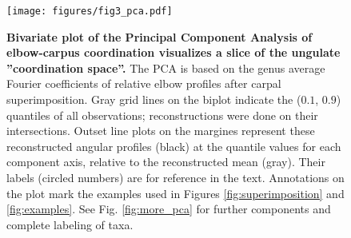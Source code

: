 \documentclass[10pt, a4paper]{article}
\begin{document}
\begin{figure}[t!]
\texttt{[image: figures/fig3\_pca.pdf]}
\caption[PCA]{\textbf{Bivariate plot of the Principal Component Analysis of elbow-carpus coordination visualizes a slice of the ungulate ''coordination space''.} 
The PCA is based on the genus average Fourier coefficients of relative elbow profiles after carpal superimposition. 
Gray grid lines on the biplot indicate the ($0.1$, $0.9$) quantiles of all observations; reconstructions were done on their intersections. 
Outset line plots on the margines represent these reconstructed angular profiles (black) at the quantile values for each component axis, relative to the reconstructed mean (gray). 
Their labels (circled numbers) are for reference in the text.
Annotations on the plot mark the examples used in Figures \ref{fig:superimposition} and \ref{fig:examples}. 
See Fig. \ref{fig:more_pca} for further components and complete labeling of taxa.
 }
\label{fig:pca}
\end{figure}
\end{document}
